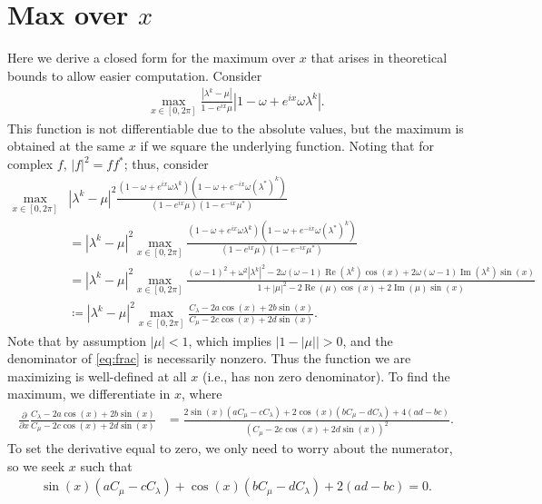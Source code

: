 \documentclass[VANCOUVER,STIX1COL]{WileyNJD-v2}
\newcommand{\Rea}{\operatorname{Re}}
\newcommand{\Ima}{\operatorname{Im}}
\begin{document}
\section{Max over $x$}

Here we derive a closed form for the maximum over $x$ that arises
in theoretical bounds to allow easier computation. Consider 
%
\begin{align}\label{eq:bound0}
\max_{x\in[0,2\pi]} \frac{|\lambda^k - \mu|}{1 - e^{ix}\mu}
	|1-\omega + e^{ix}\omega\lambda^k|.
\end{align}
%
This function is not differentiable due to the absolute values, but the
maximum is obtained at the same $x$ if we square the underlying function.
Noting that for complex $f$, $|f|^2 = ff^*$; thus, consider
%
\begin{align}
\max_{x\in[0,2\pi]} & |\lambda^k - \mu|^2
	\frac{(1-\omega + e^{ix}\omega\lambda^k)(1-\omega + e^{-ix}\omega(\lambda^*)^k)}
	{(1 - e^{ix}\mu)(1 - e^{-ix}\mu^*)} \nonumber\\
& = |\lambda^k - \mu|^2 \max_{x\in[0,2\pi]}
	\frac{(1-\omega + e^{ix}\omega\lambda^k)(1-\omega + e^{-ix}\omega(\lambda^*)^k)}
	{(1 - e^{ix}\mu)(1 - e^{-ix}\mu^*)} \nonumber\\
& = |\lambda^k - \mu|^2 \max_{x\in[0,2\pi]}
	\frac{(\omega - 1)^2 + \omega^2|\lambda^k|^2- 2\omega(\omega - 1)\Rea(\lambda^k)\cos(x) +
		2\omega(\omega - 1)\Ima(\lambda^k)\sin(x)}
	{1 + |\mu|^2 - 2\Rea(\mu)\cos(x) + 2\Ima(\mu)\sin(x)} \nonumber \\
& \coloneqq |\lambda^k - \mu|^2 \max_{x\in[0,2\pi]}
	\frac{C_\lambda - 2a\cos(x) + 2b\sin(x)}
	{C_\mu - 2c\cos(x) + 2d\sin(x)} \label{eq:frac}.
\end{align}
%
Note that by assumption $|\mu| < 1$, which implies $|1 - |\mu|| > 0$, and the
denominator of \eqref{eq:frac} is necessarily nonzero. Thus the function we are
maximizing is well-defined at all $x$ (i.e., has non zero denominator). To find
the maximum, we differentiate in $x$, where
%
\begin{align*}
\frac{\partial}{\partial x} \frac{C_\lambda - 2a\cos(x) + 2b\sin(x)}
	{C_\mu - 2c\cos(x) + 2d\sin(x)} 
& = \frac{2\sin(x)(aC_\mu - cC_\lambda) + 2\cos(x)(bC_\mu - dC_\lambda) + 4(ad -bc)}
	{(C_\mu - 2c\cos(x) + 2d\sin(x))^2}.
\end{align*}
%
To set the derivative equal to zero, we only need to worry about the numerator,
so we seek $x$ such that
%
\begin{align}\label{eq:sol-x}
\sin(x)(aC_\mu - cC_\lambda) + \cos(x)(bC_\mu - dC_\lambda) + 2(ad -bc) = 0.
\end{align}
\end{document}
